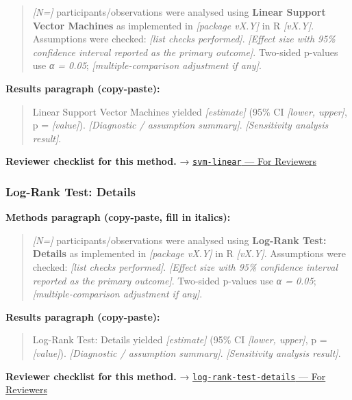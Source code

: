 \documentclass[
]{article}
\begin{document}
\begin{quote}
\emph{{[}N={]}} participants/observations were analysed using
\textbf{Linear Support Vector Machines} as implemented in
\emph{{[}package vX.Y{]}} in R \emph{{[}vX.Y{]}}. Assumptions were
checked: \emph{{[}list checks performed{]}}. \emph{{[}Effect size with
95\% confidence interval reported as the primary outcome{]}}. Two-sided
p-values use \emph{α = 0.05}; \emph{{[}multiple-comparison adjustment if
any{]}}.
\end{quote}

\textbf{Results paragraph (copy-paste):}

\begin{quote}
Linear Support Vector Machines yielded \emph{{[}estimate{]}} (95\% CI
\emph{{[}lower, upper{]}}, p = \emph{{[}value{]}}). \emph{{[}Diagnostic
/ assumption summary{]}}. \emph{{[}Sensitivity analysis result{]}}.
\end{quote}

\textbf{Reviewer checklist for this method.} →
\href{../chapters/13-ml/svm-linear.Rmd\#for-reviewers}{\texttt{svm-linear}
--- For Reviewers}

\subsubsection{Log-Rank Test: Details}\label{log-rank-test-details}

\textbf{Methods paragraph (copy-paste, fill in italics):}

\begin{quote}
\emph{{[}N={]}} participants/observations were analysed using
\textbf{Log-Rank Test: Details} as implemented in \emph{{[}package
vX.Y{]}} in R \emph{{[}vX.Y{]}}. Assumptions were checked: \emph{{[}list
checks performed{]}}. \emph{{[}Effect size with 95\% confidence interval
reported as the primary outcome{]}}. Two-sided p-values use \emph{α =
0.05}; \emph{{[}multiple-comparison adjustment if any{]}}.
\end{quote}

\textbf{Results paragraph (copy-paste):}

\begin{quote}
Log-Rank Test: Details yielded \emph{{[}estimate{]}} (95\% CI
\emph{{[}lower, upper{]}}, p = \emph{{[}value{]}}). \emph{{[}Diagnostic
/ assumption summary{]}}. \emph{{[}Sensitivity analysis result{]}}.
\end{quote}

\textbf{Reviewer checklist for this method.} →
\href{../chapters/11-survival/log-rank-test-details.Rmd\#for-reviewers}{\texttt{log-rank-test-details}
--- For Reviewers}
\end{document}
